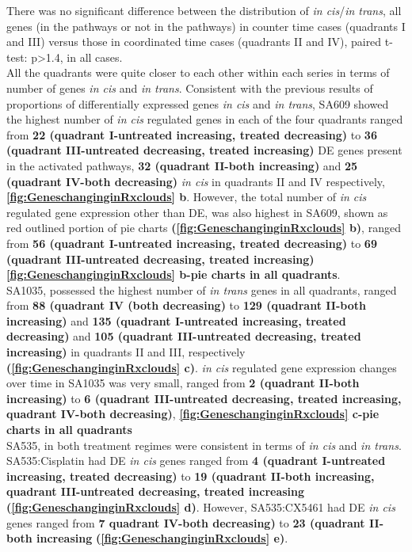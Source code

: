 There was no significant difference between the distribution of \textit{in cis}/\textit{in trans}, all genes (in the pathways or not in the pathways) in counter time cases (quadrants I and III) versus those in coordinated time cases (quadrants II and IV), paired t-test: p>1.4, in all cases.
\\
All the quadrants were quite closer to each other within each series in terms of number of genes \textit{in cis} and \textit{in trans}.
Consistent with the previous results of proportions of differentially expressed genes \textit{in cis} and \textit{in trans}, SA609 showed the highest number of \textit{in cis} regulated genes in each of the four quadrants ranged from \textbf{22 (quadrant I-untreated increasing, treated decreasing)} to \textbf{36 (quadrant III-untreated decreasing, treated increasing)} DE genes present in the activated pathways, \textbf{32 (quadrant II-both increasing)} and \textbf{25 (quadrant IV-both decreasing)} \textit{in cis} in quadrants II and IV respectively, \textbf{\autoref{fig:GeneschanginginRxclouds} b}. However, the total number of \textit{in cis} regulated gene expression other than DE, was also highest in SA609, shown as red outlined portion of pie charts \textbf{(\autoref{fig:GeneschanginginRxclouds} b)}, ranged from \textbf{56 (quadrant I-untreated increasing, treated decreasing)} to \textbf{69 (quadrant III-untreated decreasing, treated increasing)} \textbf{\autoref{fig:GeneschanginginRxclouds} b-pie charts in all quadrants}.
\\
SA1035, possessed the highest number of \textit{in trans} genes in all quadrants, ranged from \textbf{88 (quadrant IV (both decreasing)} to \textbf{129 (quadrant II-both increasing)} and \textbf{135 (quadrant I-untreated increasing, treated decreasing)} and \textbf{105 (quadrant III-untreated decreasing, treated increasing)} in quadrants II and III, respectively \textbf{(\autoref{fig:GeneschanginginRxclouds} c)}. \textit{in cis} regulated gene expression changes over time in SA1035 was very small, ranged from \textbf{2 (quadrant II-both increasing)} to \textbf{6 (quadrant III-untreated decreasing, treated increasing, quadrant IV-both decreasing)}, \textbf{\autoref{fig:GeneschanginginRxclouds} c-pie charts in all quadrants} 
\\
SA535, in both treatment regimes were consistent in terms of \textit{in cis} and \textit{in trans}. SA535:Cisplatin had DE \textit{in cis} genes ranged from \textbf{4 (quadrant I-untreated increasing, treated decreasing)} to \textbf{19 (quadrant II-both increasing, quadrant III-untreated decreasing, treated increasing} \textbf{(\autoref{fig:GeneschanginginRxclouds} d)}. However, SA535:CX5461 had DE \textit{in cis} genes ranged from \textbf{7 quadrant IV-both decreasing)} to \textbf{23 (quadrant II-both increasing} \textbf{(\autoref{fig:GeneschanginginRxclouds} e)}.




